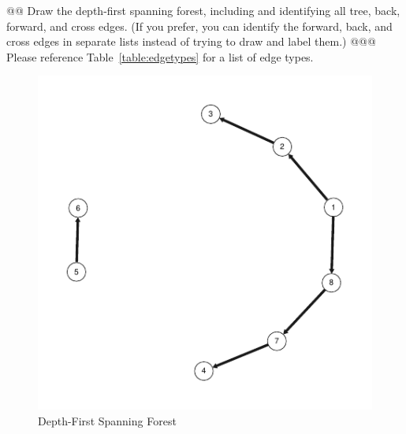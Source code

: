 \documentclass[10pt]{article}\usepackage[]{graphicx}\usepackage[]{xcolor}
\makeatletter
\def\maxwidth{ %
  \ifdim\Gin@nat@width>\linewidth
    \linewidth
  \else
    \Gin@nat@width
  \fi
}
\newenvironment{knitrout}{}{} %
\makeatother
\begin{document}
\begin{easylist}[enumerate]
    @@ Draw the depth-first spanning forest, including and identifying all tree, back, forward, and cross edges. (If you
    prefer, you can identify the forward, back, and cross edges in separate lists instead of trying to draw and label
    them.)
    @@@ Please reference Table~\ref{table:edgetypes} for a list of edge types.

\begin{knitrout}
\color{fgcolor}\begin{figure}[H]


{\centering \includegraphics[width=\maxwidth]{figure/ps8_1forest} 

}

\caption[Depth-First Spanning Forest]{Depth-First Spanning Forest\label{fig:ps8.1forest} }
\end{figure}


\end{knitrout}



\end{easylist}
\end{document}
